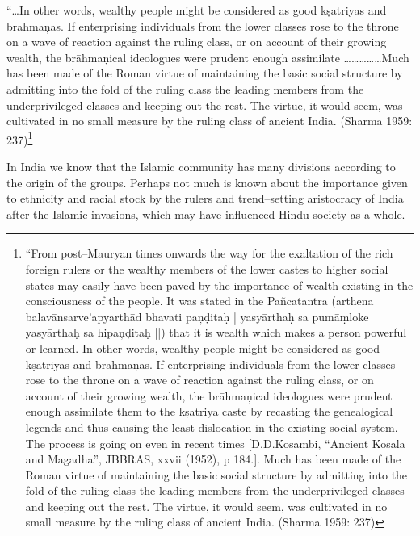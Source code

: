 \begin{myquote}
“…In other words, wealthy people might be considered as good kṣatriyas and brahmaņas. If enterprising individuals from the lower classes rose to the throne on a wave of reaction against the ruling class, or on account of their growing wealth, the brāhmaņical ideologues were prudent enough assimilate ……………Much has been made of the Roman virtue of maintaining the basic social structure by admitting into the fold of the ruling class the leading members from the underprivileged classes and keeping out the rest. The virtue, it would seem, was cultivated in no small measure by the ruling class of ancient India. (Sharma 1959: 237)\footnote{“From post–Mauryan times onwards the way for the exaltation of the rich foreign rulers or the wealthy members of the lower castes to higher social states may easily have been paved by the importance of wealth existing in the consciousness of the people. It was stated in the Pañcatantra (arthena balavānsarve’apyarthād bhavati paņḍitaḥ | yasyārthaḥ sa pumāṃloke yasyārthaḥ sa hipaņḍitaḥ ||) that it is wealth which makes a person powerful or learned. In other words, wealthy people might be considered as good kṣatriyas and brahmaņas. If enterprising individuals from the lower classes rose to the throne on a wave of reaction against the ruling class, or on account of their growing wealth, the brāhmaņical ideologues were prudent enough assimilate them to the kṣatriya caste by recasting the genealogical legends and thus causing the least dislocation in the existing social system. The process is going on even in recent times [D.D.Kosambi, “Ancient Kosala and Magadha”, JBBRAS, xxvii (1952), p 184.]. Much has been made of the Roman virtue of maintaining the basic social structure by admitting into the fold of the ruling class the leading members from the underprivileged classes and keeping out the rest. The virtue, it would seem, was cultivated in no small measure by the ruling class of ancient India. (Sharma 1959: 237)}
\end{myquote}

In India we know that the Islamic community has many divisions according to the origin of the groups. Perhaps not much is known about the importance given to ethnicity and racial stock by the rulers and trend–setting aristocracy of India after the Islamic invasions, which may have influenced Hindu society as a whole.

